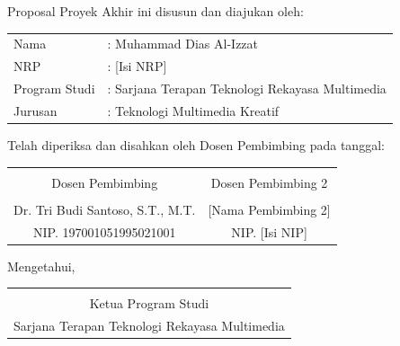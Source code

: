 \documentclass[12pt,oneside]{report}
\begin{document}
Proposal Proyek Akhir ini disusun dan diajukan oleh:

\vspace{0.5cm}

\begin{tabular}{ll}
Nama & : Muhammad Dias Al-Izzat \\
NRP & : [Isi NRP] \\
Program Studi & : Sarjana Terapan Teknologi Rekayasa Multimedia \\
Jurusan & : Teknologi Multimedia Kreatif \\
\end{tabular}

\vspace{0.5cm}

Telah diperiksa dan disahkan oleh Dosen Pembimbing pada tanggal: \underline{\hspace{3cm}}

\vspace{1.5cm}

\begin{center}
\begin{tabular}{c c}
\underline{\hspace{5cm}} & \underline{\hspace{5cm}} \\
Dosen Pembimbing & Dosen Pembimbing 2 \\
& \\
Dr. Tri Budi Santoso, S.T., M.T. & [Nama Pembimbing 2] \\
NIP. 197001051995021001 & NIP. [Isi NIP] \\
\end{tabular}
\end{center}

\vspace{2cm}

Mengetahui,

\vspace{0.5cm}

\begin{center}
\begin{tabular}{c}
\underline{\hspace{5cm}} \\
Ketua Program Studi \\
Sarjana Terapan Teknologi Rekayasa Multimedia \\
\end{tabular}
\end{center}

\end{document}
